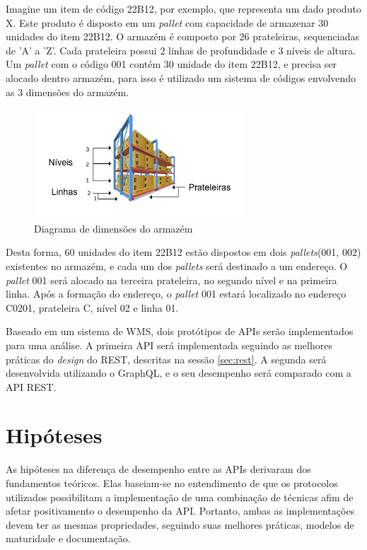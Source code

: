 Imagine um item de código 22B12, por exemplo, que representa um dado produto X. Este produto é disposto em um \textit{pallet} com capacidade de armazenar 30 unidades do item 22B12. O armazém é composto por 26 prateleiras, sequenciadas de 'A' a 'Z'. Cada prateleira possui 2 linhas de profundidade e 3 níveis de altura. Um \textit{pallet} com o código 001 contém 30 unidade do item 22B12, e precisa ser alocado dentro armazém, para isso é utilizado um sistema de códigos envolvendo as 3 dimensões do armazém.

\begin{figure}[htbp]
\centering
\includegraphics[width=0.7\textwidth]{figuras/rack.png}
\caption{Diagrama de dimensões do armazém}
\label{fig:rack}
\end{figure}

Desta forma, 60 unidades do item 22B12 estão dispostos em dois \textit{pallets}(001, 002) existentes no armazém, e cada um dos \textit{pallets} será destinado a um endereço. O \textit{pallet} 001 será alocado na terceira prateleira, no segundo nível e na primeira linha. Após a formação do endereço, o \textit{pallet} 001 estará localizado no endereço C0201, prateleira C, nível 02 e linha 01.

Baseado em um sistema de WMS, dois protótipos de APIs serão implementados para uma análise. A primeira API será implementada seguindo as melhores práticas do \textit{design} do REST, descritas na sessão \ref{sec:rest}. A segunda será desenvolvida utilizando o GraphQL, e o seu desempenho será comparado com a API REST.

\section{Hipóteses} \label{sechHipóteses}

As hipóteses na diferença de desempenho entre as APIs derivaram dos fundamentos teóricos. Elas baseiam-se no entendimento de que os protocolos utilizados possibilitam a implementação de uma combinação de técnicas afim de afetar positivamento o desempenho da API. Portanto, ambas as implementações devem ter as mesmas propriedades, seguindo suas melhores práticas, modelos de maturidade e documentação.


